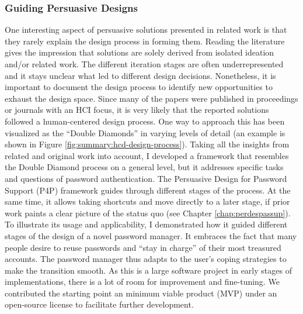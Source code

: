 \subsubsection{Guiding Persuasive Designs}
One interesting aspect of persuasive solutions presented in related work is that they rarely explain the design process in forming them. Reading the literature gives the impression that solutions are solely derived from isolated ideation and/or related work. The different iteration stages are often underrepresented and it stays unclear what led to different design decisions. Nonetheless, it is important to document the design process to identify new opportunities to exhaust the design space. Since many of the papers were published in proceedings or journals with an HCI focus, it is very likely that the reported solutions followed a human-centered design process. One way to approach this has been visualized as the ``Double Diamonds'' in varying levels of detail (an example is shown in Figure \ref{fig:summary:hcd-design-process}). Taking all the insights from related and original work into account, I developed a framework that resembles the Double Diamond process on a general level, but it addresses specific tasks and questions of password authentication. The Persuasive Design for Password Support (P4P) framework guides through different stages of the process. At the same time, it allows taking shortcuts and move directly to a later stage, if prior work paints a clear picture of the status quo (see Chapter \ref{chap:perdespassup}). To illustrate its usage and applicability, 
I demonstrated how it guided different stages of the design of a novel password manager. It embraces the fact that many people desire to reuse passwords and ``stay in charge'' of their most treasured accounts. The password manager thus adapts to the user's coping strategies to make the transition smooth. As this is a large software project in early stages of implementations, there is a lot of room for improvement and fine-tuning. We contributed the starting point an minimum viable product (MVP) under an open-source license to facilitate further development. 

